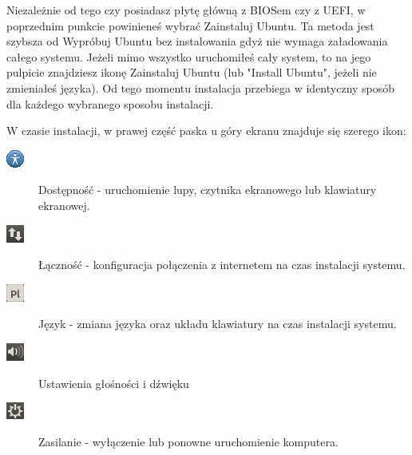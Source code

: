 Niezależnie od tego czy posiadasz płytę główną z BIOSem czy z UEFI, w poprzednim punkcie powinieneś wybrać \textcolor{ubuntu_orange}{Zainstaluj Ubuntu}. Ta metoda jest szybsza od \textcolor{ubuntu_orange}{Wypróbuj Ubuntu bez instalowania} gdyż nie wymaga załadowania całego systemu. Jeżeli mimo wszystko uruchomiłeś cały system, to na jego pulpicie znajdziesz ikonę \textcolor{ubuntu_orange}{Zainstaluj Ubuntu} (lub "Install Ubuntu", jeżeli nie zmieniałeś języka). Od tego momentu instalacja przebiega w identyczny sposób dla każdego wybranego sposobu instalacji.

W czasie instalacji, w prawej część paska u góry ekranu znajduje się szerego ikon:
\begin{description}
\item[\includegraphics{images/ikony_dostempnosc.png}]\textcolor{ubuntu_orange}{Dostępność} - uruchomienie lupy, czytnika ekranowego lub klawiatury ekranowej.
\item[\includegraphics{images/ikony_internet.png}]\textcolor{ubuntu_orange}{Łączność} - konfiguracja połączenia z internetem na czas instalacji systemu.
\item[\includegraphics{images/ikony_jezyk.png}]\textcolor{ubuntu_orange}{Język} - zmiana języka oraz układu klawiatury na czas instalacji systemu.
\item[\includegraphics{images/ikony_dzwiek.png}]\textcolor{ubuntu_orange}{Ustawienia głośności i dźwięku}
\item[\includegraphics{images/ikony_zasilanie.png}]\textcolor{ubuntu_orange}{Zasilanie} - wyłączenie lub ponowne uruchomienie komputera.
\end{description}
\clearpage
